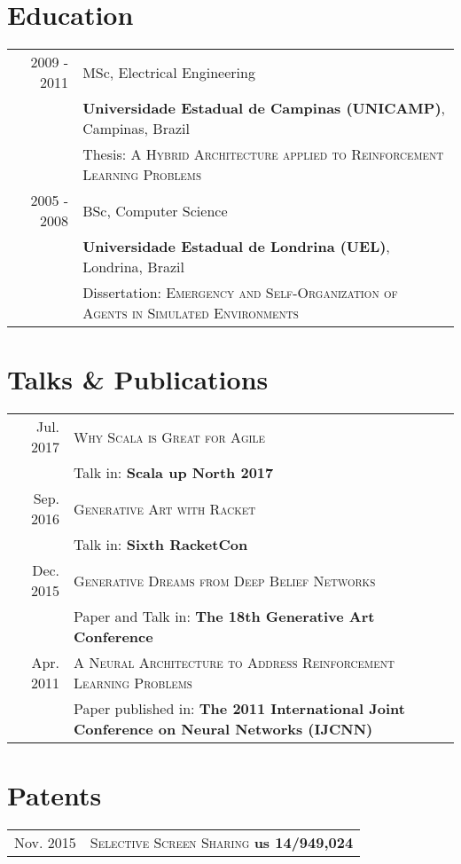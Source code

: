\documentclass[a4paper,10pt]{article}
\begin{document}
\section{Education}
\begin{tabular}{rl}
2009 - 2011 & MSc, Electrical Engineering\\
& \textbf{Universidade Estadual de Campinas (UNICAMP)}, Campinas, Brazil\\
& Thesis: \textsc{A Hybrid Architecture applied to Reinforcement Learning Problems} \\
2005 - 2008 & BSc, Computer Science\\
& \textbf{Universidade Estadual de Londrina (UEL)}, Londrina, Brazil\\
& Dissertation: \textsc{Emergency and Self-Organization of Agents in Simulated Environments}
\end{tabular}

\section{Talks \& Publications}
\begin{tabular}{rl}
 Jul. 2017 & \textsc{Why Scala is Great for Agile}\\
 				   & Talk in: \textbf{Scala up North 2017}\\
 Sep. 2016 & \textsc{Generative Art with Racket}\\
					 & Talk in: \textbf{Sixth RacketCon}\\
 Dec. 2015 & \textsc{Generative Dreams from Deep Belief Networks}\\
 				   & Paper and Talk in: \textbf{The 18th Generative Art Conference}\\
 Apr. 2011 & \textsc{A Neural Architecture to Address Reinforcement Learning Problems}\\
 				   & Paper published in: \textbf{The 2011 International Joint Conference on Neural Networks (IJCNN)}\\
\end{tabular}

\section{Patents}
\begin{tabular}{rl}
 Nov. 2015 & \textsc{Selective Screen Sharing} \textbf{us 14/949,024}\\
\end{tabular}
\end{document}
